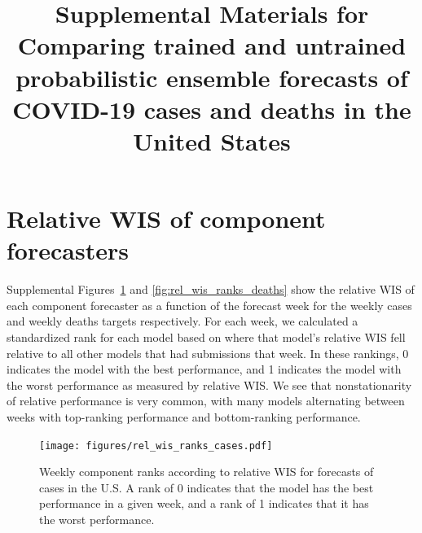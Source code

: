 \documentclass{article}
\begin{document}
\title{Supplemental Materials for Comparing trained and untrained probabilistic ensemble forecasts of COVID-19 cases and deaths in the United States}



\date{}

\maketitle

\linenumbers

\section{Relative WIS of component forecasters}

Supplemental Figures~\ref{fig:rel_wis_ranks_cases} and \ref{fig:rel_wis_ranks_deaths} show the relative WIS of each component forecaster as a function of the forecast week for the weekly cases and weekly deaths targets respectively. For each week, we calculated a standardized rank for each model based on where that model's relative WIS fell relative to all other models that had submissions that week. In these rankings, 0 indicates the model with the best performance, and 1 indicates the model with the worst performance as measured by relative WIS. We see that nonstationarity of relative performance is very common, with many models alternating between weeks with top-ranking performance and bottom-ranking performance.

\begin{figure}[H]
    \centering
    \texttt{[image: figures/rel\_wis\_ranks\_cases.pdf]}
    \caption{Weekly component ranks according to relative WIS for forecasts of cases in the U.S. A rank of 0 indicates that the model has the best performance in a given week, and a rank of 1 indicates that it has the worst performance.}
    \label{fig:rel_wis_ranks_cases}
\end{figure}
\end{document}

